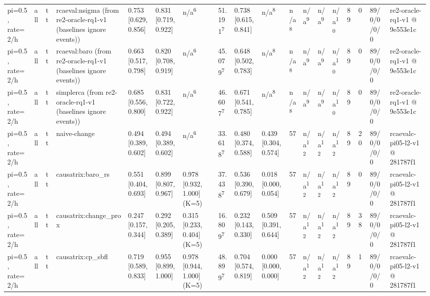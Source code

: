 \begin{table}[t]
\begin{tabular}{llllllllllllllllll}
pi=0.5, rate=2/h & all & tt & rcaeval:nsigma (from re2-oracle-rq1-v1 (baselines ignore events)) & 0.753 [0.629, 0.856] & 0.831 [0.719, 0.922] & n/a\textsuperscript{6} & 51.191\textsuperscript{7} & 0.738 [0.615, 0.841] & n/a\textsuperscript{8} & n/a\textsuperscript{8} & n/a\textsuperscript{9} & n/a\textsuperscript{9} & n/a\textsuperscript{10} & 89 & 0 & 89/0/0/0/0 & re2-oracle-rq1-v1 @ 9e553e1c \\
pi=0.5, rate=2/h & all & tt & rcaeval:baro (from re2-oracle-rq1-v1 (baselines ignore events)) & 0.663 [0.517, 0.798] & 0.820 [0.708, 0.919] & n/a\textsuperscript{6} & 45.079\textsuperscript{7} & 0.648 [0.502, 0.783] & n/a\textsuperscript{8} & n/a\textsuperscript{8} & n/a\textsuperscript{9} & n/a\textsuperscript{9} & n/a\textsuperscript{10} & 89 & 0 & 89/0/0/0/0 & re2-oracle-rq1-v1 @ 9e553e1c \\
pi=0.5, rate=2/h & all & tt & simplerca (from re2-oracle-rq1-v1 (baselines ignore events)) & 0.685 [0.556, 0.800] & 0.831 [0.722, 0.922] & n/a\textsuperscript{6} & 46.607\textsuperscript{7} & 0.671 [0.541, 0.785] & n/a\textsuperscript{8} & n/a\textsuperscript{8} & n/a\textsuperscript{9} & n/a\textsuperscript{9} & n/a\textsuperscript{10} & 89 & 0 & 89/0/0/0/0 & re2-oracle-rq1-v1 @ 9e553e1c \\
pi=0.5, rate=2/h & all & tt & naive-change & 0.494 [0.389, 0.602] & 0.494 [0.389, 0.602] & n/a\textsuperscript{6} & 33.618\textsuperscript{7} & 0.480 [0.374, 0.588] & 0.439 [0.304, 0.574] & 57 & n/a\textsuperscript{12} & n/a\textsuperscript{12} & n/a\textsuperscript{12} & 89 & 20 & 89/0/0/0/0 & rcaevalc-pi05-l2-v1 @ 281787f1 \\
pi=0.5, rate=2/h & all & tt & causatrix:baro\_rs & 0.551 [0.404, 0.693] & 0.899 [0.807, 0.967] & 0.978 [0.932, 1.000] (K=5) & 37.438\textsuperscript{7} & 0.536 [0.390, 0.679] & 0.018 [0.000, 0.054] & 57 & n/a\textsuperscript{12} & n/a\textsuperscript{12} & n/a\textsuperscript{12} & 89 & 0 & 89/0/0/0/0 & rcaevalc-pi05-l2-v1 @ 281787f1 \\
pi=0.5, rate=2/h & all & tt & causatrix:change\_prox & 0.247 [0.157, 0.344] & 0.292 [0.205, 0.389] & 0.315 [0.233, 0.404] (K=5) & 16.809\textsuperscript{7} & 0.232 [0.143, 0.330] & 0.509 [0.391, 0.644] & 57 & n/a\textsuperscript{12} & n/a\textsuperscript{12} & n/a\textsuperscript{12} & 89 & 38 & 89/0/0/0/0 & rcaevalc-pi05-l2-v1 @ 281787f1 \\
pi=0.5, rate=2/h & all & tt & causatrix:cp\_sbfl & 0.719 [0.589, 0.833] & 0.955 [0.899, 1.000] & 0.978 [0.944, 1.000] (K=5) & 48.899\textsuperscript{7} & 0.704 [0.574, 0.819] & 0.000 [0.000, 0.000] & 57 & n/a\textsuperscript{12} & n/a\textsuperscript{12} & n/a\textsuperscript{12} & 89 & 1 & 89/0/0/0/0 & rcaevalc-pi05-l2-v1 @ 281787f1 \\

\end{tabular}
\end{table}
